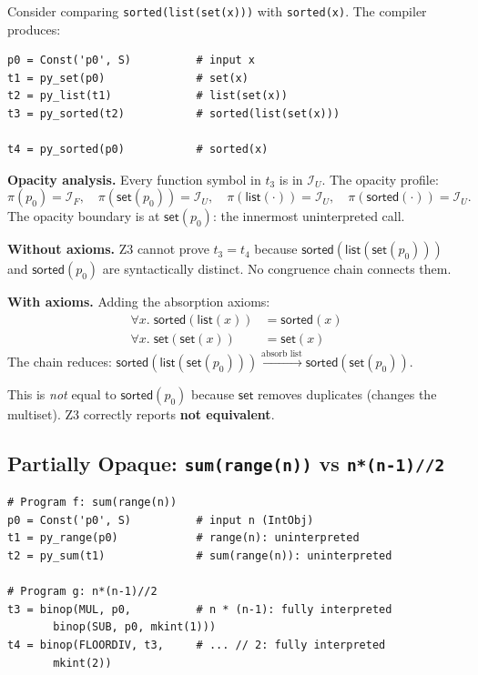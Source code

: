 Consider comparing \verb|sorted(list(set(x)))| with \verb|sorted(x)|.
The compiler produces:

\begin{lstlisting}[caption={Fully opaque chain}]
p0 = Const('p0', S)          # input x
t1 = py_set(p0)              # set(x)
t2 = py_list(t1)             # list(set(x))
t3 = py_sorted(t2)           # sorted(list(set(x)))

t4 = py_sorted(p0)           # sorted(x)
\end{lstlisting}

\textbf{Opacity analysis.}  Every function symbol in $t_3$ is in
$\mathcal{I}_U$.  The opacity profile:
\[
  \pi(p_0) = \mathcal{I}_F, \quad
  \pi(\mathsf{set}(p_0)) = \mathcal{I}_U, \quad
  \pi(\mathsf{list}(\cdot)) = \mathcal{I}_U, \quad
  \pi(\mathsf{sorted}(\cdot)) = \mathcal{I}_U.
\]
The opacity boundary is at $\mathsf{set}(p_0)$: the innermost
uninterpreted call.

\textbf{Without axioms.}  Z3 cannot prove $t_3 = t_4$ because
$\mathsf{sorted}(\mathsf{list}(\mathsf{set}(p_0)))$ and
$\mathsf{sorted}(p_0)$ are syntactically distinct.  No congruence
chain connects them.

\textbf{With axioms.}  Adding the absorption axioms:
\begin{align}
  \forall x.\; \mathsf{sorted}(\mathsf{list}(x))
    &= \mathsf{sorted}(x)
    \tag{sorted absorbs list} \\
  \forall x.\; \mathsf{set}(\mathsf{set}(x))
    &= \mathsf{set}(x)
    \tag{I3: set idempotent}
\end{align}
The chain reduces:
$\mathsf{sorted}(\mathsf{list}(\mathsf{set}(p_0)))
\xrightarrow{\text{absorb list}}
\mathsf{sorted}(\mathsf{set}(p_0))$.

This is \emph{not} equal to $\mathsf{sorted}(p_0)$ because
$\mathsf{set}$ removes duplicates (changes the multiset).
Z3 correctly reports \textbf{not equivalent}.

\subsection{Partially Opaque: \texttt{sum(range(n))} vs \texttt{n*(n-1)//2}}

\begin{lstlisting}[caption={Mixed opacity levels}]
# Program f: sum(range(n))
p0 = Const('p0', S)          # input n (IntObj)
t1 = py_range(p0)            # range(n): uninterpreted
t2 = py_sum(t1)              # sum(range(n)): uninterpreted

# Program g: n*(n-1)//2
t3 = binop(MUL, p0,          # n * (n-1): fully interpreted
       binop(SUB, p0, mkint(1)))
t4 = binop(FLOORDIV, t3,     # ... // 2: fully interpreted
       mkint(2))
\end{lstlisting}

